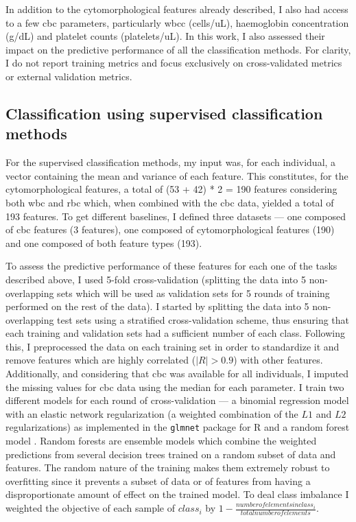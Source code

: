In addition to the cytomorphological features already described, I also had access to a few \ac{cbc} parameters, particularly \ac{wbcc} (cells/uL), haemoglobin concentration (g/dL) and platelet counts (platelets/uL). In this work, I also assessed their impact on the predictive performance of all the classification methods. For clarity, I do not report training metrics and focus exclusively on cross-validated metrics or external validation metrics.

\subsection{Classification using supervised classification methods}

For the supervised classification methods, my input was, for each individual, a vector containing the mean and variance of each feature. This constitutes, for the cytomorphological features, a total of (53 + 42) * 2 = 190 features considering both \ac{wbc} and \ac{rbc} which, when combined with the \ac{cbc} data, yielded a total of 193 features. To get different baselines, I defined three datasets --- one composed of \ac{cbc} features (3 features), one composed of cytomorphological features (190) and one composed of both feature types (193). 

To assess the predictive performance of these features for each one of the tasks described above, I used 5-fold cross-validation (splitting the data into 5 non-overlapping sets which will be used as validation sets for 5 rounds of training performed on the rest of the data). I started by splitting the data into 5 non-overlapping test sets using a stratified cross-validation scheme, thus ensuring that each training and validation sets had a sufficient number of each class. Following this, I preprocessed the data on each training set in order to standardize it and remove features which are highly correlated ($|R|>0.9$) with other features. Additionally, and considering that \ac{cbc} was available for all individuals, I imputed the missing values for \ac{cbc} data using the median for each parameter. I train two different models for each round of cross-validation --- a binomial regression model with an elastic network regularization (a weighted combination of the $L1$ and $L2$ regularizations) as implemented in the \texttt{glmnet} package for R \cite{Friedman2010-gl} and a random forest model \cite{Breiman2001-yz}. Random forests are ensemble models which combine the weighted predictions from several decision trees trained on a random subset of data and features. The random nature of the training makes them extremely robust to overfitting since it prevents a subset of data or of features from having a disproportionate amount of effect on the trained model. To deal class imbalance I weighted the objective of each sample of $class_i$ by $1-\frac{number of elements in class_i}{total number of elements}$. 

